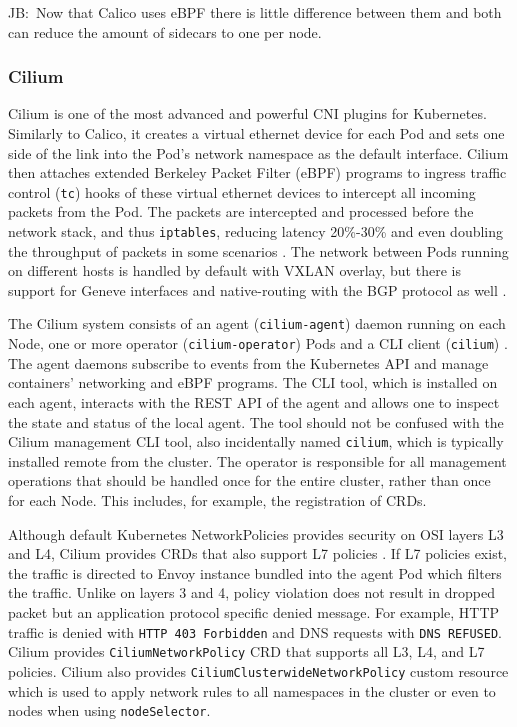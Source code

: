\documentclass[english, 12pt, a4paper, sci, utf8, a-2b, online]{aaltothesis}
\newcommand{\mycomment}[3]{\textcolor{#1}{#2:~#3}}
\newcommand{\jb}[1]{\noindent\mycomment{aaltoRed}{JB}{#1}}
\begin{document}
\jb{Now that Calico uses eBPF there is little difference between them and both can reduce the amount of sidecars to one per node.}

\subsubsection{Cilium}

Cilium \cite{cilium} is one of the most advanced and powerful CNI plugins for Kubernetes.
Similarly to Calico, it creates a virtual ethernet device for each Pod and sets one side of the link into the Pod's network namespace \cite{cilium-tkng} as the default interface.
Cilium then attaches extended Berkeley Packet Filter (eBPF) programs to ingress traffic control (\texttt{tc}) hooks of these virtual ethernet devices to intercept all incoming packets from the Pod.
The packets are intercepted and processed before the network stack, and thus \texttt{iptables}, reducing latency 20\%-30\% and even doubling the throughput of packets in some scenarios \cite{budigiri2021network}.
The network between Pods running on different hosts is handled by default with VXLAN overlay, but there is support for Geneve interfaces and native-routing with the BGP protocol as well \cite{cilium}.

The Cilium system consists of an agent (\texttt{cilium-agent}) daemon running on each Node, one or more operator (\texttt{cilium-operator}) Pods and a CLI client (\texttt{cilium}) \cite{cilium-components}.
The agent daemons subscribe to events from the Kubernetes API and manage containers' networking and eBPF programs.
The CLI tool, which is installed on each agent, interacts with the REST API of the agent and allows one to inspect the state and status of the local agent.
The tool should not be confused with the Cilium management CLI tool, also incidentally named \texttt{cilium}, which is typically installed remote from the cluster.
The operator is responsible for all management operations that should be handled once for the entire cluster, rather than once for each Node.
This includes, for example, the registration of CRDs.

Although default Kubernetes NetworkPolicies provides security on OSI layers L3 and L4, Cilium provides CRDs that also support L7 policies \cite{cilium-policy-language}.
If L7 policies exist, the traffic is directed to Envoy instance bundled into the agent Pod which filters the traffic.
Unlike on layers 3 and 4, policy violation does not result in dropped packet but an application protocol specific denied message.
For example, HTTP traffic is denied with \texttt{HTTP 403 Forbidden} and DNS requests with \texttt{DNS REFUSED}.
Cilium provides \texttt{CiliumNetworkPolicy} CRD that supports all L3, L4, and L7 policies.
Cilium also provides \texttt{CiliumClusterwideNetworkPolicy} custom resource which is used to apply network rules to all namespaces in the cluster or even to nodes when using \texttt{nodeSelector}.
\end{document}
